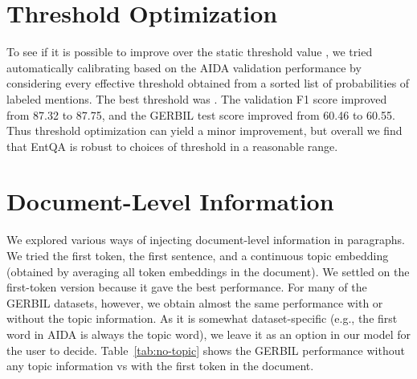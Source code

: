 \documentclass{article} \clearpage{}\usepackage{amsmath,amssymb,amsthm,bbm}
\theoremstyle{definition}
\begin{document}
\appendix
\section{Threshold Optimization}
\label{app:threshold}

To see if it is possible to improve over the static threshold value , we tried automatically calibrating  based on the AIDA validation performance
by considering every effective threshold obtained from a sorted list of probabilities of labeled mentions.
The best threshold was . The validation F1 score improved from 87.32 to 87.75,
and the GERBIL test score improved from 60.46 to 60.55.
Thus threshold optimization can yield a minor improvement, but overall we find that EntQA is robust to choices of threshold in a reasonable range.

\section{Document-Level Information}
\label{app:doc-level}

We explored various ways of injecting document-level information in paragraphs.
We tried the first token, the first sentence, and a continuous topic embedding (obtained by averaging all token embeddings in the document).
We settled on the first-token version because it gave the best performance.
For many of the GERBIL datasets, however, we obtain almost the same performance with or without the topic information.
As it is somewhat dataset-specific (e.g., the first word in AIDA is always the topic word), we leave it as an option in our model for the user to decide.
Table~\ref{tab:no-topic} shows the GERBIL performance without any topic information vs with the first token in the document.
\end{document}
